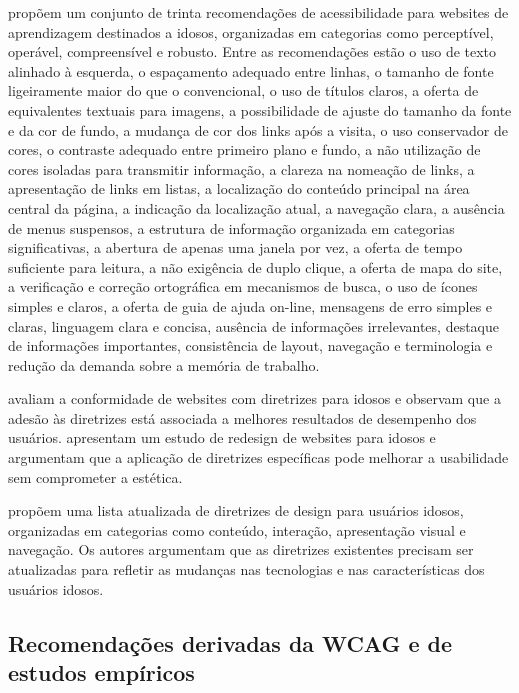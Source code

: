 \cite{sun2010preliminary} propõem um conjunto de trinta recomendações de acessibilidade para websites de aprendizagem destinados a idosos, organizadas em categorias como perceptível, operável, compreensível e robusto. Entre as recomendações estão o uso de texto alinhado à esquerda, o espaçamento adequado entre linhas, o tamanho de fonte ligeiramente maior do que o convencional, o uso de títulos claros, a oferta de equivalentes textuais para imagens, a possibilidade de ajuste do tamanho da fonte e da cor de fundo, a mudança de cor dos links após a visita, o uso conservador de cores, o contraste adequado entre primeiro plano e fundo, a não utilização de cores isoladas para transmitir informação, a clareza na nomeação de links, a apresentação de links em listas, a localização do conteúdo principal na área central da página, a indicação da localização atual, a navegação clara, a ausência de menus suspensos, a estrutura de informação organizada em categorias significativas, a abertura de apenas uma janela por vez, a oferta de tempo suficiente para leitura, a não exigência de duplo clique, a oferta de mapa do site, a verificação e correção ortográfica em mecanismos de busca, o uso de ícones simples e claros, a oferta de guia de ajuda on-line, mensagens de erro simples e claras, linguagem clara e concisa, ausência de informações irrelevantes, destaque de informações importantes, consistência de layout, navegação e terminologia e redução da demanda sobre a memória de trabalho.

\cite{hart2008evaluating} avaliam a conformidade de websites com diretrizes para idosos e observam que a adesão às diretrizes está associada a melhores resultados de desempenho dos usuários. \cite{patsoule2012redesigning} apresentam um estudo de redesign de websites para idosos e argumentam que a aplicação de diretrizes específicas pode melhorar a usabilidade sem comprometer a estética.

\cite{lindberg2021towards} propõem uma lista atualizada de diretrizes de design para usuários idosos, organizadas em categorias como conteúdo, interação, apresentação visual e navegação. Os autores argumentam que as diretrizes existentes precisam ser atualizadas para refletir as mudanças nas tecnologias e nas características dos usuários idosos.

\subsection{Recomendações derivadas da WCAG e de estudos empíricos}

